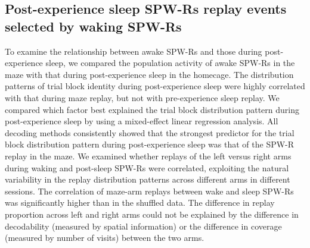 \subsection{Post-experience sleep SPW-Rs replay events selected by waking SPW-Rs}

To examine the relationship between awake SPW-Rs and those during post-experience sleep, we compared the population activity of awake SPW-Rs in the maze with that during post-experience sleep in the homecage. The distribution patterns of trial block identity during post-experience sleep were highly correlated with that during maze replay, but not with pre-experience sleep replay. We compared which factor best explained the trial block distribution pattern during post-experience sleep by using a mixed-effect linear regression analysis. All decoding methods consistently showed that the strongest predictor for the trial block distribution pattern during post-experience sleep was that of the SPW-R replay in the maze. We examined whether replays of the left versus right arms during waking and post-sleep SPW-Rs were correlated, exploiting the natural variability in the replay distribution patterns across different arms in different sessions. The correlation of maze-arm replays between wake and sleep SPW-Rs was significantly higher than in the shuffled data. The difference in replay proportion across left and right arms could not be explained by the difference in decodability (measured by spatial information) or the difference in coverage (measured by number of visits) between the two arms.

